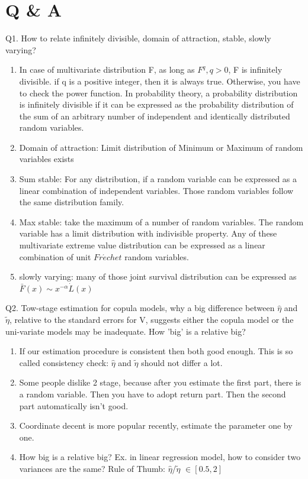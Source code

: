 \documentclass[a4paper,12pt]{texMemo}
\begin{document}
\maketitle %
\section{Q \& A}
Q1. How to relate infinitely divisible, domain of attraction, stable, slowly varying?
\begin{enumerate}
\item In case of multivariate distribution F, as long as $F^q, q>0$, F is infinitely divisible. if q is a positive integer, then it is always true. Otherwise, you have to check the power function.
In probability theory, a probability distribution is infinitely divisible if it can be expressed as the probability distribution of the sum of an arbitrary number of independent and identically distributed random variables. 
\item Domain of attraction: Limit distribution of Minimum or Maximum of random variables exists
\item Sum stable: For any distribution, if a random variable can be expressed as a linear combination of independent variables. Those random variables follow the same distribution family.
\item Max stable: take the maximum of a number of random variables. The random variable has a limit distribution with indivisible property. Any of these multivariate extreme value distribution can be expressed as a linear combination of unit $Fr\acute{e}chet$ random variables.
\item slowly varying: many of those joint survival distribution can be expressed as $\bar{F}(x) \sim x^{-\alpha}\dot L(x)$
\end{enumerate}

Q2. Tow-stage estimation for copula models, why a big difference between $\hat{\eta}$ and $\tilde{\eta}$, relative to the standard errors for V, suggests either the copula model or the uni-variate models may be inadequate. How 'big' is a relative big?
\begin{enumerate}
\item If our estimation procedure is consistent then both good enough. This is so called consistency check: $\hat{\eta}$ and $\tilde{\eta}$ should not differ a lot.
\item Some people dislike 2 stage, because after you estimate the first part, there is a random variable. Then you have to adopt return part. Then the second part automatically isn't good.
\item Coordinate decent is more popular recently, estimate the parameter one by one. 
\item How big is a relative big? Ex. in linear regression model, how to consider two variances are the same? Rule of Thumb: $\hat{\eta}$/$\tilde{\eta}$ $\in [0.5, 2]$
\end{enumerate}
\end{document}
